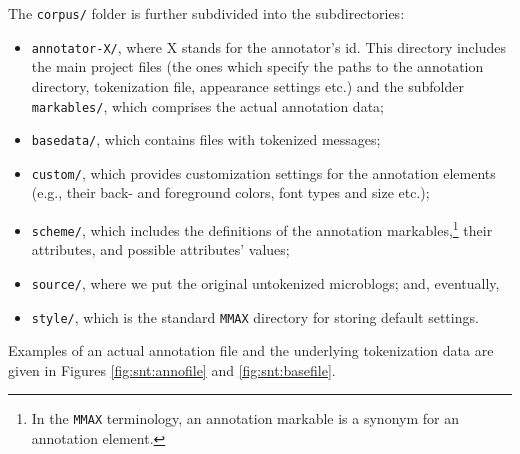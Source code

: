 The \texttt{corpus/} folder is further subdivided into the
subdirectories: { \setlength{\linewidth}{\textwidth}
\begin{itemize}
\item\texttt{annotator-X/}, where X stands for the annotator's id.
  This directory includes the main project files (the ones which
  specify the paths to the annotation directory, tokenization file,
  appearance settings etc.) and the subfolder \texttt{markables/},
  which comprises the actual annotation data;

\item\texttt{basedata/}, which contains files with tokenized messages;

\item\texttt{custom/}, which provides customization settings for the
  annotation elements (e.g., their back- and foreground colors, font
  types and size etc.);

\item\texttt{scheme/}, which includes the definitions of the
  annotation markables,\footnote{In the \texttt{MMAX} terminology, an
    annotation markable is a synonym for an annotation element.}
  their attributes, and possible attributes' values;

\item\texttt{source/}, where we put the original untokenized
  microblogs; and, eventually,

\item\texttt{style/}, which is the standard \texttt{MMAX} directory
  for storing default settings.
\end{itemize}
}

Examples of an actual annotation file and the underlying tokenization
data are given in Figures \ref{fig:snt:annofile} and
\ref{fig:snt:basefile}.

